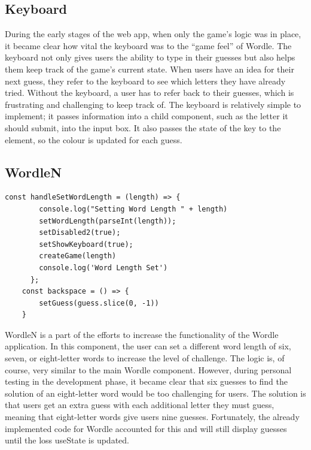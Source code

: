 \subsection{Keyboard}
During the early stages of the web app, when only the game's logic was in place, it became clear how vital the keyboard was to the “game feel” of Wordle. The keyboard not only gives users the ability to type in their guesses but also helps them keep track of the game's current state. When users have an idea for their next guess, they refer to the keyboard to see which letters they have already tried. Without the keyboard, a user has to refer back to their guesses, which is frustrating and challenging to keep track of. 
The keyboard is relatively simple to implement; it passes information into a child component, such as the letter it should submit, into the input box. It also passes the state of the key to the element, so the colour is updated for each guess. 

\subsection{WordleN}
\begin{lstlisting}[style=python, caption={The setWordLength handler function}]
const handleSetWordLength = (length) => {
        console.log("Setting Word Length " + length)
        setWordLength(parseInt(length));
        setDisabled2(true);
        setShowKeyboard(true);
        createGame(length)
        console.log('Word Length Set')
      };
    const backspace = () => {
        setGuess(guess.slice(0, -1))
    }
\end{lstlisting}
WordleN is a part of the efforts to increase the functionality of the Wordle application. In this component, the user can set a different word length of six, seven, or eight-letter words to increase the level of challenge. The logic is, of course, very similar to the main Wordle component. However, during personal testing in the development phase, it became clear that six guesses to find the solution of an eight-letter word would be too challenging for users. The solution is that users get an extra guess with each additional letter they must guess, meaning that eight-letter words give users nine guesses. Fortunately, the already implemented code for Wordle accounted for this and will still display guesses until the loss useState is updated.

